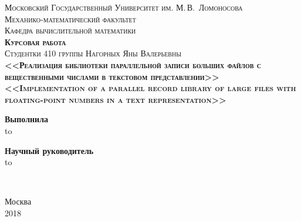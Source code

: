 \begin{titlepage}
	\begin{center}
		\textsc{ 
		\small{
			Московский Государственный Университет им. М.\,В.~Ломоносова \\\vspace{5pt}
 			Механико-математический факультет \\ \vspace{5pt} 
 			Кафедра вычислительной математики
 			}
 		} 
		\\\vspace{2em} 
		\textsc{\textbf{\large{Курсовая работа}}\\ \vspace{15pt}
			Студентки 410 группы\linebreak
			Нагорных Яны Валерьевны \linebreak \\ 
			\large{
				\textbf{<<Реализация библиотеки параллельной записи больших файлов с вещественными числами в текстовом представлении>>} \\\vspace{10pt} 	
				\textbf{<<Implementation of a parallel record library of large files with floating-point numbers in a text representation>>}
			} 
		}
	\end{center}
	\vspace{3em} 
	\newbox{\lbox} 
	\newlength{\maxl} \setlength{\maxl}{\wd\lbox} \hfill\parbox{15em}
	{
		\hspace*{7em}\hspace*{-7em}
		\textbf{Выполнила}\\
	 	\hfill\hbox to \\ 
	}
	
	\newbox{\lbox} \hfill\parbox{15em}
	{
		\hspace*{7em}\hspace*{-7em}
		\textbf{Научный руководитель}\\
		\hfill\hbox to
	}
	\\ \vspace{14pt}
	\begin{center} 
		Москва \\ 
		2018
	\end{center} 
\end{titlepage}

